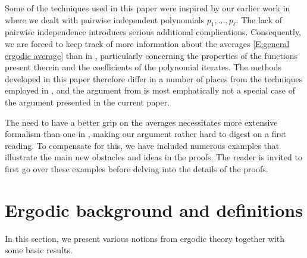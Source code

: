 \documentclass[11pt]{amsart}
\theoremstyle{definition}
\begin{document}
Some of the techniques used  in this paper were inspired by our earlier work in \cite{FrKu22} where we dealt with pairwise independent polynomials $p_1, \ldots, p_\ell$.  The lack of pairwise independence introduces serious additional complications. Consequently, we are forced to keep track of more information about the averages \eqref{E:general ergodic average} than in \cite{FrKu22}, particularly concerning the properties of the functions present therein and the coefficients of the polynomial iterates. The methods developed in this paper therefore differ in a number of places from the techniques employed in \cite{FrKu22}, and the argument from \cite{FrKu22} is most emphatically not a special case of the argument presented in the current paper.

The need to have a better grip on the averages necessitates more extensive formalism than one in \cite{FrKu22}, making our argument rather hard to digest on a first reading. To compensate for this, we have included numerous examples that illustrate the main new obstacles and ideas in the proofs. The reader is invited to first go over these examples  before delving into the details of the proofs.






\section{Ergodic background and definitions}\label{S:background}
In this section, we present various notions from ergodic theory together with some basic results.
\end{document}
